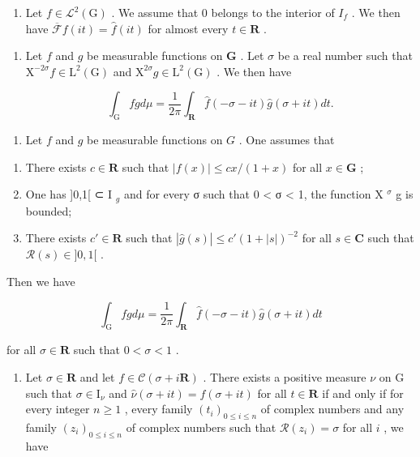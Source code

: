 \begin{enumerate}
\def\labelenumi{\alph{enumi})}
\setcounter{enumi}{2}
\tightlist
\item
  Let \(f \in \mathcal{L}^{2}(\mathrm{G})\) . We assume that 0 belongs to the interior of \(I_{f}\) . We then have \(\overline{\mathcal{F}} f(it) = \widehat{f}(it)\) for almost every \(t \in \mathbf{R}\) .
\end{enumerate}

\begin{enumerate}
\def\labelenumi{\alph{enumi})}
\setcounter{enumi}{3}
\item
  Let \(f\) and \(g\) be measurable functions on \(\mathbf{G}\) . Let \(\sigma\) be a real number such that \(\mathrm{X}^{-2\sigma}f\in \mathrm{L}^2 (\mathrm{G})\) and \(\mathrm{X}^{2\sigma}g\in \mathrm{L}^2 (\mathrm{G})\) . We then have

\[
\int_ {\mathrm{G}} f g d \mu = \frac {1}{2 \pi} \int_ {\mathbf {R}} \widehat {f} (- \sigma - i t) \widehat {g} (\sigma + i t) d t.
\]

\end{enumerate}

\begin{enumerate}
\def\labelenumi{\alph{enumi})}
\setcounter{enumi}{4}
\tightlist
\item
  Let \(f\) and \(g\) be measurable functions on \(G\) . One assumes that
\end{enumerate}

\begin{enumerate}
\def\labelenumi{(\roman{enumi})}
\item
  There exists \(c \in \mathbf{R}\) such that \(|f(x)| \leqslant cx / (1 + x)\) for all \(x \in \mathbf{G}\) ;
\item
  One has ]0,1[ ⊂ I \(_{g}\) and for every σ such that 0 < σ < 1, the function X \(^{\sigma}\) g is bounded;
\item
  There exists \(c' \in \mathbf{R}\) such that \(|\widehat{g}(s)| \leqslant c'(1 + |s|)^{-2}\) for all \(s \in \mathbf{C}\) such that \(\mathcal{R}(s) \in ]0, 1[\) .
\end{enumerate}

Then we have

\[
\int_ {\mathrm{G}} f g d \mu = \frac {1}{2 \pi} \int_ {\mathbf {R}} \widehat {f} (- \sigma - i t) \widehat {g} (\sigma + i t) d t
\]

for all \(\sigma\in\mathbf{R}\) such that \(0<\sigma<1\) .

\begin{enumerate}
\def\labelenumi{\alph{enumi})}
\setcounter{enumi}{5}
\tightlist
\item
  Let \(\sigma \in \mathbf{R}\) and let \(f \in \mathcal{C}(\sigma + i\mathbf{R})\) . There exists a positive measure \(\nu\) on G such that \(\sigma \in \mathrm{I}_{\nu}\) and \(\widehat{\nu}(\sigma + it) = f(\sigma + it)\) for all \(t \in \mathbf{R}\) if and only if for every integer \(n \geqslant 1\) , every family \((t_i)_{0 \leqslant i \leqslant n}\) of complex numbers and any family \((z_i)_{0 \leqslant i \leqslant n}\) of complex numbers such that \(\mathcal{R}(z_i) = \sigma\) for all \(i\) , we have
\end{enumerate}

